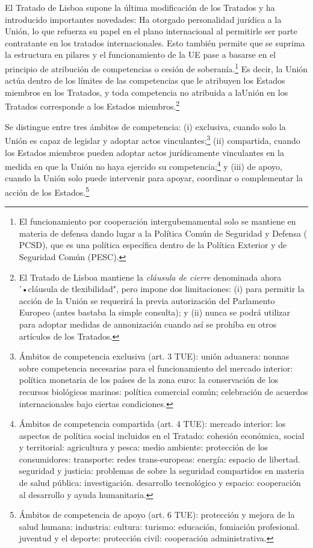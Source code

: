 \documentclass[10pt,a4paper]{article}
\begin{document}
El Tratado de Lisboa supone la última modificación de los Tratados y ha introducido importantes novedades: 
Ha otorgado personalidad jurídica a la Unión, lo que refuerza su papel en el plano internacional al permitirle ser parte contratante en los tratados internacionales. Esto también permite que se suprima la estructura en pilares y el funcionamiento de la UE pase a basarse en el principio de atribución de competencias o cesión de soberanía.\footnote{%
    El funcionamiento por cooperación intergubemamental solo se mantiene en materia de defensa dando lugar a la Política Común de Seguridad y Defensa ( PCSD), que es una política específica dentro de la Política Exterior y de Seguridad Común (PESC).
} Es decir, la Unión actúa dentro de los límites de las competencias que le  atribuyen los Estados miembros en los Tratados, y toda competencia no atribuida a laUnión en los Tratados corresponde a los Estados miembros.\footnote{%
    El Tratado de Lisboa mantiene la \textit{cláusula de cierre} denominada ahora '•cláusula de tlexibilidad", pero impone dos limitaciones: (i) para permitir la acción de la Unión se requerirá la previa autorización del Parlamento Europeo (antes bastaba la simple consulta); y (ii) nunca se podrá utilizar para adoptar medidas de annonización cuando así se prohíba en otros artículos de los Tratados.
}

Se distingue entre tres ámbitos de competencia: (i) exclusiva, cuando solo la Unión es capaz de legislar y adoptar actos vinculantes;\footnote{%
    Ámbitos de competencia exclusiva (art. 3 TUE): unión aduanera: nonnas sobre competencia necesarias para el funcionamiento del mercado interior: política monetaria de los países de la zona euro: la conservación de los recursos biológicos marinos: política comercial común; celebración de acuerdos internacionales bajo ciertas condiciones.
} (ii) compartida, cuando los Estados miembros pueden adoptar actos jurídicamente vinculantes en la medida en que la Unión no haya ejercido su competencia;\footnote{%
    Ámbitos de competencia compartida (art. 4 TUE): mercado interior: los aspectos de política social incluidos en el Tratado: cohesión económica, social y territorial: agricultura y pesca: medio ambiente: protección de los consumidores: transporte: redes trans-europeas: energía: espacio de libertad. seguridad y justicia: problemas de sobre la seguridad compartidos en materia de salud pública: investigación. desarrollo tecnológico y espacio: cooperación al desarrollo y ayuda humanitaria.
} y (iii) de apoyo, cuando la Unión solo puede intervenir para apoyar, coordinar o complementar la acción de los Estados.\footnote{%
    Ámbitos de competencia de apoyo (art. 6 TUE): protección y mejora de la salud humana: industria: cultura: turismo: educación, fomiación profesional. juventud y el deporte: protección civil: cooperación administrativa.
} 
\end{document}
